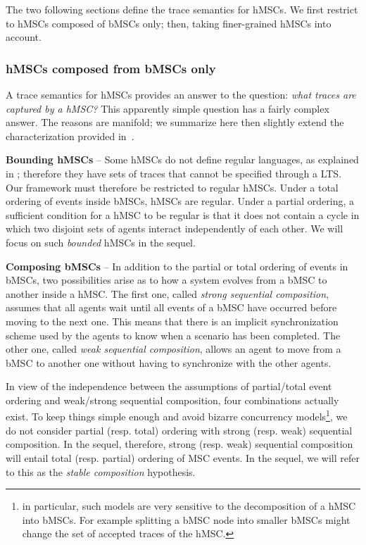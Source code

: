 The two following sections define the trace semantics for hMSCs. We first restrict to hMSCs composed of bMSCs only; then, taking finer-grained hMSCs into account. 

\subsubsection*{hMSCs composed from bMSCs only\label{subsubsection:hMSC-bMSC-only}}

A trace semantics for hMSCs provides an answer to the question: \emph{what traces are captured by a hMSC?} This apparently simple question has a fairly complex answer. The reasons are manifold; we summarize here then slightly extend the characterization provided in~\cite{Uchitel:2004}.

\noindent \textbf{Bounding hMSCs} -- Some hMSCs do not define regular languages, as explained in \cite{Henriksen:2000}; therefore they have sets of traces that cannot be specified through a LTS. Our framework must therefore be restricted to regular hMSCs. Under a total ordering of events inside bMSCs, hMSCs are regular. Under a partial ordering, a sufficient condition for a hMSC to be regular is that it does not contain a cycle in which two disjoint sets of agents interact independently of each other. We will focus on such \emph{bounded} hMSCs in the sequel.

\noindent \textbf{Composing bMSCs} -- In addition to the partial or total ordering of events in bMSCs, two possibilities arise as to how a system evolves from a bMSC to another inside a hMSC. The first one, called \emph{strong sequential composition}, assumes that all agents wait until all events of a bMSC have occurred before moving to the next one. This means that there is an implicit synchronization scheme used by the agents to know when a scenario has been completed. The other one, called \emph{weak sequential composition}, allows an agent to move from a bMSC to another one without having to synchronize with the other agents. 

In view of the independence between the assumptions of partial/total event ordering and weak/strong sequential composition, four combinations actually exist. To keep things simple enough and avoid bizarre concurrency models\footnote{in particular, such models are very sensitive to the decomposition of a hMSC into bMSCs. For example splitting a bMSC node into smaller bMSCs might change the set of accepted traces of the hMSC.}, we do not consider partial (resp. total) ordering with strong (resp. weak) sequential composition. In the sequel, therefore, strong (resp. weak) sequential composition will entail total (resp. partial) ordering of MSC events. In the sequel, we will refer to this as the \emph{stable composition} hypothesis. 

